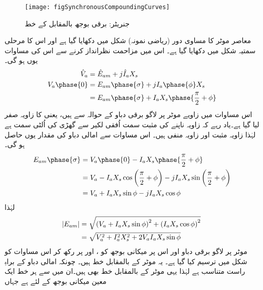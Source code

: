 \begin{figure}
\centering
\texttt{[image: figSynchronousCompoundingCurves]}
\caption{جنریٹر: برقی بوجھ بالمقابل  کے خط}
\label{شکل_معاصر_بار_بالمقابل_میدانی_رو}
\end{figure}
معاصر موٹر کا مساوی دور (ریاضی نمونہ) شکل   میں دکھایا گیا ہے اور اس کا مرحلی سمتیہ شکل   میں دکھایا گیا ہے۔ اس میں مزاحمت نظرانداز کرنے سے اس کی مساوات یوں ہو گی۔
\begin{gather}
\begin{aligned}
\hat{V}_a&=\hat{E}_{am}+j \hat{I}_a X_s\\
V_a \phase{0}&=E_{am} \phase{\sigma} +j I_a \phase{\phi} X_s\\
&=E_{am} \phase{\sigma} +I_a X_s \phase{\frac{\pi}{2}+\phi}
\end{aligned}
\end{gather}
اس مساوات میں زاویے موٹر پر لاگو برقی دباو  کے حوالہ سے ہیں، یعنی   کا زاویہ صفر لیا گیا ہے۔یاد رہے کہ زاویہ ناپنے کی مثبت سمت اُفقی لکیر سے گھڑی کی اُلٹی سمت ہے لہٰذا  زاویہ مثبت اور  زاویہ منفی ہیں۔ اس مساوات سے امالی دباو  کی مقدار یوں حاصل ہو گی۔
\begin{align*}
E_{am}\phase{\sigma}&=V_a \phase{0}-I_a X_s \phase{\frac{\pi}{2}+\phi}\\
&=V_a -I_a X_s  \cos \left( \frac{\pi}{2}+\phi\right)- j I_a X_s \sin \left(\frac{\pi}{2}+\phi \right)\\
&=V_a +I_a X_s \sin \phi-j I_a X_s \cos \phi
\end{align*}
لہٰذا
\begin{gather}
\begin{aligned}\label{مسوات_معاصر_دوری_مساوات}
\abs{E_{am}}&=\sqrt{\left(V_a +I_a X_s \sin \phi \right)^2+\left(I_a X_s \cos \phi \right)^2}\\
&=\sqrt{V_a^2+I_a^2 X_s^2+ 2 V_a I_a X_s \sin \phi}
\end{aligned}
\end{gather}
موٹر پر لاگو برقی دباو اور اس پر میکانی بوجھ کو ،  اور  پر رکھ کر اس مساوات کو شکل    میں  ترسیم کیا گیا ہے۔ یہ موٹر کے  بالمقابل   خط ہیں۔ چونکہ امالی دباو  کے براہِ راست متناسب ہے لہٰذا یہی موٹر کے  بالمقابل  خط بھی ہیں۔ان میں سے ہر خط ایک معین میکانی بوجھ  کے لئے ہے جہاں
